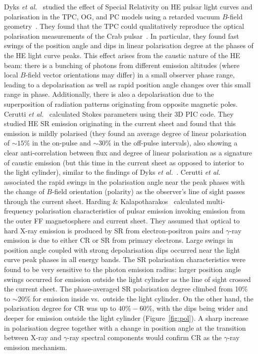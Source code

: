 \documentclass{PoS}
\begin{document}
Dyks \textit{et al.}~\cite{Dyks04} studied the effect of Special Relativity on HE pulsar light curves and polarisation in the TPC, OG, and PC models using a retarded vacuum $B$-field geometry~\cite{Deutsch55}. They found that the TPC could qualitatively reproduce the optical polarisation measurements of the Crab pulsar~\cite{Slowikowska09}. In particular, they found fast swings of the position angle and dips in linear polarisation degree at the phases of the HE light curve peaks. This effect arises from the caustic nature of the HE beam: there is a bunching of photons from different emission altitudes (where local $B$-field vector orientations may differ) in a small observer phase range, leading to a depolarisation as well as rapid position angle changes over this small range in phase. Additionally, there is also a depolarisation due to the superposition of radiation patterns originating from opposite magnetic poles. Cerutti \textit{et al.}~\cite{Cerutti16b} calculated Stokes parameters using their 3D PIC code. They studied HE SR emission originating in the current sheet and found that this emission is mildly polarised (they found an average degree of linear polarisation of $\sim15\%$ in the on-pulse and $\sim30\%$ in the off-pulse intervals), also showing a clear anti-correlation between flux and degree of linear polarisation as a signature of caustic emission (but this time in the current sheet as opposed to interior to the light cylinder), similar to the findings of Dyks \textit{et al.}~\cite{Dyks04}. Cerutti \textit{et al.}~\cite{Cerutti16b} associated the rapid swings in the polarisation angle near the peak phases with the change of $B$-field orientation (polarity) as the observer's line of sight passes through the current sheet. Harding \& Kalapotharakos~\cite{Harding_pol17} calculated multi-frequency polarisation characteristics of pulsar emission invoking emission from the outer FF magnetosphere and current sheet. They assumed that optical to hard X-ray emission is produced by SR from electron-positron pairs and $\gamma$-ray emission is due to either CR or SR from primary electrons. Large swings in position angle coupled with strong depolarisation dips occurred near the light curve peak phases in all energy bands. The SR polarisation characteristics were found to be very sensitive to the photon emission radius: larger position angle swings occurred for emission outside the light cylinder as the line of sight crossed the current sheet. The phase-averaged SR polarisation degree climbed from 10\% to $\sim$20\% for emission inside vs.\ outside the light cylinder. On the other hand, the polarisation degree for CR was up to $40\%-60\%$, with the dips being wider and deeper for emission outside the light cylinder (Figure~\ref{fig:pol}). A sharp increase in polarisation degree together with a change in position angle at the transition between X-ray and $\gamma$-ray spectral components would confirm CR as the $\gamma$-ray emission mechanism.
\end{document}

